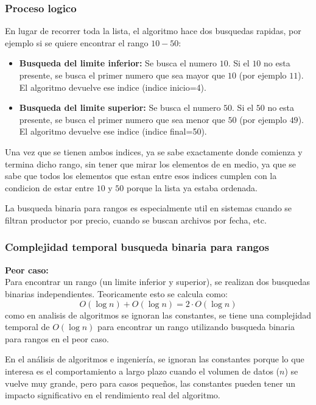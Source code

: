 \documentclass[9pt,letterpaper,onecolumn]{rho-class/rho}
\begin{document}
        \subsubsection*{Proceso logico}
        En lugar de recorrer toda la lista, el algoritmo hace dos busquedas rapidas, por ejemplo si se quiere encontrar el rango $10-50$:
        \begin{itemize}
            \item \textbf{Busqueda del limite inferior:} Se busca el numero $10$. Si el $10$ no esta presente, se busca el primer numero
            que sea mayor que $10$ (por ejemplo $11$). El algoritmo devuelve ese indice (indice inicio=4).
            \item \textbf{Busqueda del limite superior:} Se busca el numero $50$. Si el $50$ no esta presente, se busca el primer numero
             que sea menor que $50$ (por ejemplo $49$). El algoritmo devuelve ese indice (indice final=50).
        \end{itemize}
        Una vez que se tienen ambos indices, ya se sabe exactamente donde comienza y termina dicho rango, sin tener que mirar los elementos
        de en medio, ya que se sabe que todos los elementos que estan entre esos indices cumplen con la condicion de estar entre $10$ y $50$ porque
        la lista ya estaba ordenada.\\
        \begin{note}
        La busqueda binaria para rangos es especialmente util en sistemas cuando se filtran productor por precio, cuando se buscan archivos por
        fecha, etc.
        \end{note}
        \subsubsection{Complejidad temporal busqueda binaria para rangos}
        \textbf{Peor caso:}\\
        Para encontrar un rango (un limite inferior y superior), se realizan dos busquedas binarias independientes. Teoricamente esto se calcula como:
        $$O(\log n)+O(\log n)=2 \cdot O(\log n)$$ como en analisis de algoritmos se ignoran las constantes, se tiene una complejidad temporal 
        de $O(\log n)$ para encontrar un rango utilizando busqueda binaria para rangos en el peor caso.

        \begin{info}\label{info:constantes}
            En el análisis de algoritmos e ingeniería, se ignoran las constantes porque lo que interesa es el comportamiento a largo plazo 
            cuando el volumen de datos ($n$) se vuelve muy grande, pero para casos pequeños, las constantes pueden tener un impacto 
            significativo en el rendimiento real del algoritmo.
        \end{info}
\end{document}
